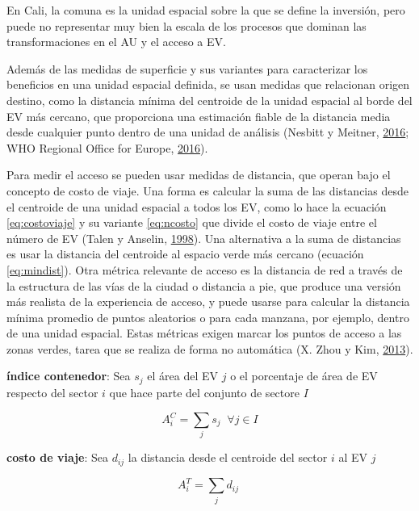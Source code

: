 \documentclass[12pt,a4paper,openany]{book}
\theoremstyle{definition}
\theoremstyle{definition}
\theoremstyle{definition}
\theoremstyle{remark}
\begin{document}
En Cali, la comuna es la unidad espacial sobre la que se define la
inversión, pero puede no representar muy bien la escala de los procesos
que dominan las transformaciones en el AU y el acceso a EV.

Además de las medidas de superficie y sus variantes para caracterizar
los beneficios en una unidad espacial definida, se usan medidas que
relacionan origen destino, como la distancia mínima del centroide de la
unidad espacial al borde del EV más cercano, que proporciona una
estimación fiable de la distancia media desde cualquier punto dentro de
una unidad de análisis (Nesbitt y Meitner,
\protect\hyperlink{ref-nesbitt_exploring_2016}{2016}; WHO Regional
Office for Europe, \protect\hyperlink{ref-who2016urban}{2016}).

Para medir el acceso se pueden usar medidas de distancia, que operan
bajo el concepto de costo de viaje. Una forma es calcular la suma de las
distancias desde el centroide de una unidad espacial a todos los EV,
como lo hace la ecuación \eqref{eq:costoviaje} y su variante
\eqref{eq:ncosto} que divide el costo de viaje entre el número de EV
(Talen y Anselin, \protect\hyperlink{ref-talen_assessing_1998}{1998}).
Una alternativa a la suma de distancias es usar la distancia del
centroide al espacio verde más cercano (ecuación \eqref{eq:mindist}). Otra
métrica relevante de acceso es la distancia de red a través de la
estructura de las vías de la ciudad o distancia a pie, que produce una
versión más realista de la experiencia de acceso, y puede usarse para
calcular la distancia mínima promedio de puntos aleatorios o para cada
manzana, por ejemplo, dentro de una unidad espacial. Estas métricas
exigen marcar los puntos de acceso a las zonas verdes, tarea que se
realiza de forma no automática (X. Zhou y Kim,
\protect\hyperlink{ref-zhou_social_2013}{2013}).

\textbf{índice contenedor}: Sea \(s_j\) el área del EV \(j\) o el
porcentaje de área de EV respecto del sector \(i\) que hace parte del
conjunto de sectore \(I\)

\begin{equation}
A^{C}_i =\sum_j{s_j} \;  \; \forall  j \in I
\label{eq:contenedor}
\end{equation}

\textbf{costo de viaje}: Sea \(d_{ij}\) la distancia desde el centroide
del sector \(i\) al EV \(j\)

\begin{equation}
A^{T}_i =\sum_j{d_{ij}} \; 
\label{eq:costoviaje}
\end{equation}
\end{document}
